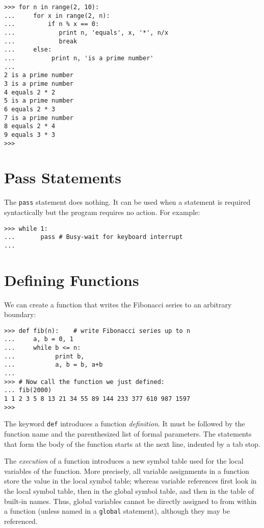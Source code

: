 \bcode\begin{verbatim}
>>> for n in range(2, 10):
...     for x in range(2, n):
...         if n % x == 0:
...            print n, 'equals', x, '*', n/x
...            break
...     else:
...          print n, 'is a prime number'
... 
2 is a prime number
3 is a prime number
4 equals 2 * 2
5 is a prime number
6 equals 2 * 3
7 is a prime number
8 equals 2 * 4
9 equals 3 * 3
>>> 
\end{verbatim}\ecode

\section{Pass Statements}

The {\tt pass} statement does nothing.
It can be used when a statement is required syntactically but the
program requires no action.
For example:

\bcode\begin{verbatim}
>>> while 1:
...       pass # Busy-wait for keyboard interrupt
... 
\end{verbatim}\ecode

\section{Defining Functions}

We can create a function that writes the Fibonacci series to an
arbitrary boundary:

\bcode\begin{verbatim}
>>> def fib(n):    # write Fibonacci series up to n
...     a, b = 0, 1
...     while b <= n:
...           print b,
...           a, b = b, a+b
... 
>>> # Now call the function we just defined:
... fib(2000)
1 1 2 3 5 8 13 21 34 55 89 144 233 377 610 987 1597
>>> 
\end{verbatim}\ecode
%
The keyword {\tt def} introduces a function {\em definition}.  It must
be followed by the function name and the parenthesized list of formal
parameters.  The statements that form the body of the function starts at
the next line, indented by a tab stop.

The {\em execution} of a function introduces a new symbol table used
for the local variables of the function.  More precisely, all variable
assignments in a function store the value in the local symbol table;
whereas
variable references first look in the local symbol table, then
in the global symbol table, and then in the table of built-in names.
Thus,
global variables cannot be directly assigned to from within a
function (unless named in a {\tt global} statement), although
they may be referenced.

